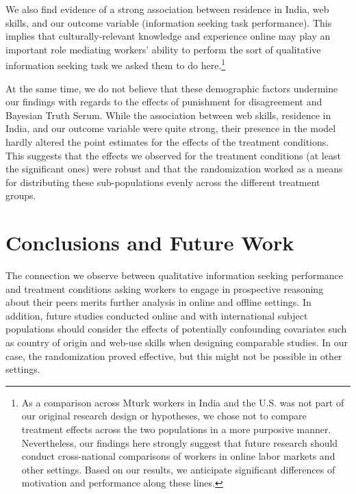 \documentclass{chi2009}
\begin{document}
We also find evidence of a strong association between residence in
India, web skills, and our outcome variable (information seeking task
performance). This implies that culturally-relevant knowledge and
experience online may play an important role mediating workers'
ability to perform the sort of qualitative information seeking task we
asked them to do here.\footnote{As a comparison across Mturk workers
  in India and the U.S. was not part of our original research design
  or hypotheses, we chose not to compare treatment effects across the
  two populations in a more purposive manner. Nevertheless, our
  findings here strongly suggest that future research should conduct
  cross-national comparisons of workers in online labor markets and
  other settings. Based on our results, we anticipate significant
  differences of motivation and performance along these
  lines.\cite{antin2011desirability}}

At the same time, we do not believe that these demographic factors
undermine our findings with regards to the effects of punishment for
disagreement and Bayesian Truth Serum. While the association between
web skills, residence in India, and our outcome variable were quite
strong, their presence in the model hardly altered the point estimates
for the effects of the treatment conditions. This suggests that the
effects we observed for the treatment conditions (at least the
significant ones) were robust and that the randomization worked as a
means for distributing these sub-populations evenly across the
different treatment groups.


\section{Conclusions and Future Work}

The connection we observe between qualitative information seeking
performance and treatment conditions asking workers to engage in
prospective reasoning about their peers merits further analysis in
online and offline settings. In addition, future studies conducted
online and with international subject populations should consider the
effects of potentially confounding covariates such as country of
origin and web-use skills when designing comparable studies. In our
case, the randomization proved effective, but this might not be
possible in other settings. 
\end{document}
